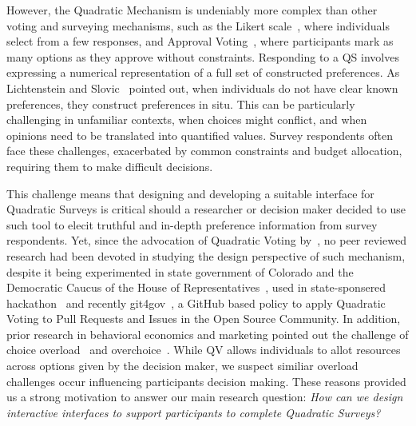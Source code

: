 However, the Quadratic Mechanism is undeniably more complex than other voting and surveying mechanisms, such as the Likert scale~\cite{likertTechniqueMeasurementAttitudes1932}, where individuals select from a few responses, and Approval Voting~\cite{bramsApprovalVoting1978}, where participants mark as many options as they approve without constraints. Responding to a QS involves expressing a numerical representation of a full set of constructed preferences. As Lichtenstein and Slovic~\cite{lichtensteinConstructionPreference2006} pointed out, when individuals do not have clear known preferences, they construct preferences in situ. This can be particularly challenging in unfamiliar contexts, when choices might conflict, and when opinions need to be translated into quantified values. Survey respondents often face these challenges, exacerbated by common constraints and budget allocation, requiring them to make difficult decisions.

This challenge means that designing and developing a suitable interface for Quadratic Surveys is critical should a researcher or decision maker decided to use such tool to elecit truthful and in-depth preference information from survey respondents. Yet, since the advocation of Quadratic Voting by~\textcite{posner2018radical}, no peer reviewed research had been devoted in studying the design perspective of such mechanism, despite it being experimented in state government of Colorado and the Democratic Caucus of the House of Representatives~\cite{QuadraticVotingColorado}, used in state-sponsered hackathon~\cite{teamTaiwanDigitalMinister} and recently git4gov~\cite{Gov4gitDecentralizedPlatform2023}, a GitHub based policy to apply Quadratic Voting to Pull Requests and Issues in the Open Source Community. In addition, prior research in behavioral economics and marketing pointed out the challenge of choice overload~\cite{iyengarWhenChoiceDemotivating2000} and overchoice~\cite{gourvilleOverchoiceAssortmentType2005}. While QV allows individuals to allot resources across options given by the decision maker, we suspect similiar overload challenges occur influencing participants decision making. These reasons provided us a strong motivation to answer our main research question: \textit{How can we design interactive interfaces to support participants to complete Quadratic Surveys?}

